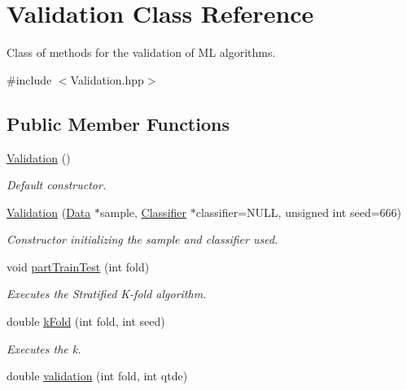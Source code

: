 \hypertarget{class_validation}{}\section{Validation Class Reference}
\label{class_validation}


Class of methods for the validation of ML algorithms.  




{\ttfamily \#include $<$Validation.\+hpp$>$}

\subsection*{Public Member Functions}
\begin{DoxyCompactItemize}
\item 
\mbox{\label{class_validation_ada040c6d31004cc277e2b74290eec266}} 
\hyperlink{class_validation_ada040c6d31004cc277e2b74290eec266}{Validation} ()
\begin{DoxyCompactList}\small\item\em Default constructor. \end{DoxyCompactList}\item 
\hyperlink{class_validation_a83ac736d2ed4d21140a05ff6ccbdec40}{Validation} (\hyperlink{class_data}{Data} $\ast$sample, \hyperlink{class_classifier}{Classifier} $\ast$classifier=N\+U\+LL, unsigned int seed=666)
\begin{DoxyCompactList}\small\item\em Constructor initializing the sample and classifier used. \end{DoxyCompactList}\item 
void \hyperlink{class_validation_afc2e7f15bc873853b70e2cc3c47eecdc}{part\+Train\+Test} (int fold)
\begin{DoxyCompactList}\small\item\em Executes the Stratified K-\/fold algorithm. \end{DoxyCompactList}\item 
double \hyperlink{class_validation_a3aae72caef37b12a57aaf5cdd862de3a}{k\+Fold} (int fold, int seed)
\begin{DoxyCompactList}\small\item\em Executes the k. \end{DoxyCompactList}\item 
double \hyperlink{class_validation_a8d4b505b7e85e1fc9c90515ad3454977}{validation} (int fold, int qtde)

\end{DoxyCompactItemize}
